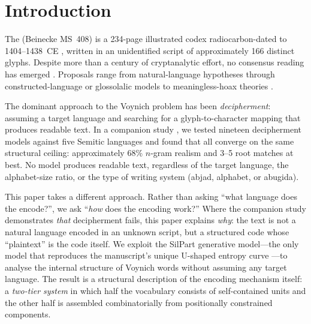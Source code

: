 
\section{Introduction}
\label{sec:intro}

The \vms{} (Beinecke MS~408) is a 234-page illustrated codex radiocarbon-dated to 1404--1438~CE \citep{hodgins2011}, written in an unidentified script of approximately 166 distinct glyphs.  Despite more than a century of cryptanalytic effort, no consensus reading has emerged \citep{dimperio1978, clemens2016}.  Proposals range from natural-language hypotheses \citep{stolfi1997, hauer2016} through constructed-language or glossolalic models \citep{rugg2004} to meaningless-hoax theories \citep{gaskell2022}.

The dominant approach to the Voynich problem has been \emph{decipherment}: assuming a target language and searching for a glyph-to-character mapping that produces readable text.  In a companion study \citep{jimenez2026}, we tested nineteen decipherment models against five Semitic languages and found that all converge on the same structural ceiling: approximately 68\% $n$-gram realism and 3--5 root matches at best.  No model produces readable text, regardless of the target language, the alphabet-size ratio, or the type of writing system (abjad, alphabet, or abugida).

This paper takes a different approach.  Rather than asking ``what language does the \vms{} encode?'', we ask ``\emph{how} does the encoding work?''  Where the companion study demonstrates \emph{that} decipherment fails, this paper explains \emph{why}: the text is not a natural language encoded in an unknown script, but a structured code whose ``plaintext'' is the code itself.  We exploit the SilPart generative model---the only model that reproduces the manuscript's unique U-shaped entropy curve \citep{jimenez2026}---to analyse the internal structure of Voynich words without assuming any target language.  The result is a structural description of the encoding mechanism itself: a \emph{two-tier system} in which half the vocabulary consists of self-contained units and the other half is assembled combinatorially from positionally constrained components.


